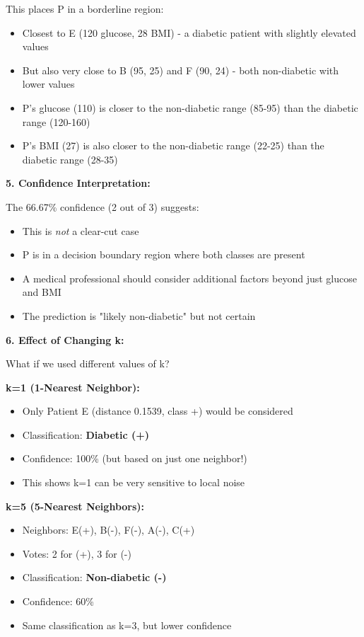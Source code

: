 \documentclass[12pt]{article}
\begin{document}
\begin{explanation}
This places P in a borderline region:
\begin{itemize}
    \item Closest to E (120 glucose, 28 BMI) - a diabetic patient with slightly elevated values
    \item But also very close to B (95, 25) and F (90, 24) - both non-diabetic with lower values
    \item P's glucose (110) is closer to the non-diabetic range (85-95) than the diabetic range (120-160)
    \item P's BMI (27) is also closer to the non-diabetic range (22-25) than the diabetic range (28-35)
\end{itemize}

\textbf{5. Confidence Interpretation:}

The 66.67\% confidence (2 out of 3) suggests:
\begin{itemize}
    \item This is \textit{not} a clear-cut case
    \item P is in a decision boundary region where both classes are present
    \item A medical professional should consider additional factors beyond just glucose and BMI
    \item The prediction is "likely non-diabetic" but not certain
\end{itemize}

\textbf{6. Effect of Changing k:}

What if we used different values of k?

\textbf{k=1 (1-Nearest Neighbor):}
\begin{itemize}
    \item Only Patient E (distance 0.1539, class +) would be considered
    \item Classification: \textbf{Diabetic (+)}
    \item Confidence: 100\% (but based on just one neighbor!)
    \item This shows k=1 can be very sensitive to local noise
\end{itemize}

\textbf{k=5 (5-Nearest Neighbors):}
\begin{itemize}
    \item Neighbors: E(+), B(-), F(-), A(-), C(+)
    \item Votes: 2 for (+), 3 for (-)
    \item Classification: \textbf{Non-diabetic (-)}
    \item Confidence: 60\%
    \item Same classification as k=3, but lower confidence
\end{itemize}


\end{explanation}
\end{document}
